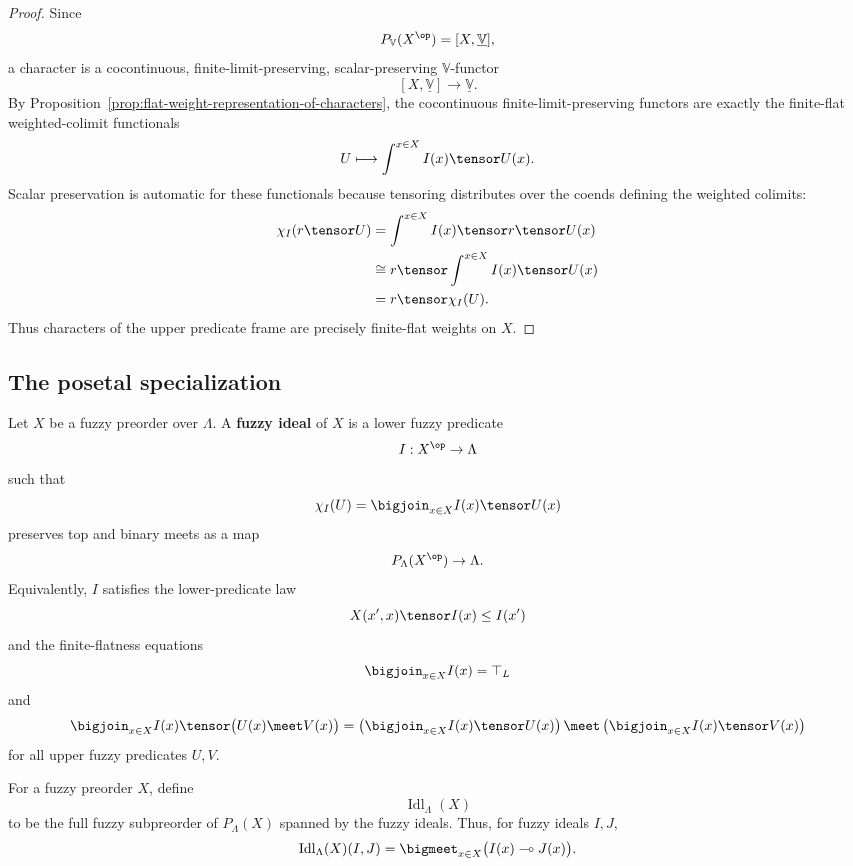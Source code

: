 \begin{proof}
Since
\[
    P_{\mathbb V}(X^{\op})=[X,\underline{\mathbb V}],
\]
a character is a cocontinuous, finite-limit-preserving, scalar-preserving
\(\mathbb V\)-functor
\[
    [X,\underline{\mathbb V}]\to\underline{\mathbb V}.
\]
By Proposition~\ref{prop:flat-weight-representation-of-characters}, the
cocontinuous finite-limit-preserving functors are exactly the finite-flat
weighted-colimit functionals
\[
    U\longmapsto\int^{x\in X}I(x)\tensor U(x).
\]
Scalar preservation is automatic for these functionals because tensoring
distributes over the coends defining the weighted colimits:
\[
\begin{aligned}
    \chi_I(r\tensor U)
    &=
    \int^{x\in X} I(x)\tensor r\tensor U(x)\\
    &\cong
    r\tensor
    \int^{x\in X}I(x)\tensor U(x)\\
    &=
    r\tensor\chi_I(U).
\end{aligned}
\]
Thus characters of the upper predicate frame are precisely finite-flat weights on
\(X\).
\end{proof}

\subsection{The posetal specialization}
\label{subsec:fuzzy-ideals-posetal}

\begin{definition}
\label{def:fuzzy-ideal-posetal}
Let \(X\) be a fuzzy preorder over \(\Lambda\).  A \textbf{fuzzy ideal} of \(X\) is
a lower fuzzy predicate
\[
    I:X^{\op}\to\Lambda
\]
such that
\[
    \chi_I(U)
    =
    \bigjoin_{x\in X} I(x)\tensor U(x)
\]
preserves top and binary meets as a map
\[
    P_\Lambda(X^{\op})\to\Lambda.
\]
Equivalently, \(I\) satisfies the lower-predicate law
\[
    X(x',x)\tensor I(x)\leq I(x')
\]
and the finite-flatness equations
\[
    \bigjoin_{x\in X}I(x)=\top_L
\]
and
\[
    \bigjoin_{x\in X}I(x)\tensor\bigl(U(x)\meet V(x)\bigr)
    =
    \left(\bigjoin_{x\in X}I(x)\tensor U(x)\right)
    \meet
    \left(\bigjoin_{x\in X}I(x)\tensor V(x)\right)
\]
for all upper fuzzy predicates \(U,V\).
\end{definition}

\begin{definition}
\label{def:fuzzy-ideal-preorder-posetal}
For a fuzzy preorder \(X\), define
\[
    \operatorname{Idl}_\Lambda(X)
\]
to be the full fuzzy subpreorder of \(P_\Lambda(X)\) spanned by the fuzzy ideals.
Thus, for fuzzy ideals \(I,J\),
\[
    \operatorname{Idl}_\Lambda(X)(I,J)
    =
    \bigmeet_{x\in X}
    \bigl(I(x)\multimap J(x)\bigr).
\]
\end{definition}

